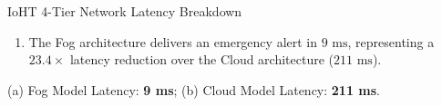 \begin{solved}{IoHT 4-Tier Network Latency Breakdown}
\begin{enumerate}[leftmargin=*]
  \begin{equation}
  T_{\text{up}} = 1 + 2 + 2 + 100 = 105\text{ ms}
  \end{equation}
  \begin{equation}
  T_{\text{down}} = 100 + 2 + 2 + 1 = 105\text{ ms}
  \end{equation}
  \begin{equation}
  T_{\text{cloud}} = T_{\text{up}} + T_{\text{proc, cloud}} + T_{\text{down}} = 105\text{ ms} + 1\text{ ms} + 105\text{ ms} = 211\text{ ms}
  \end{equation}
  \item The Fog architecture delivers an emergency alert in \textbf{$9\text{ ms}$}, representing a $23.4\times$ latency reduction over the Cloud architecture (\textbf{$211\text{ ms}$}).
\end{enumerate}
\Answer (a) Fog Model Latency: \textbf{9 ms}; (b) Cloud Model Latency: \textbf{211 ms}.
\end{solved}

